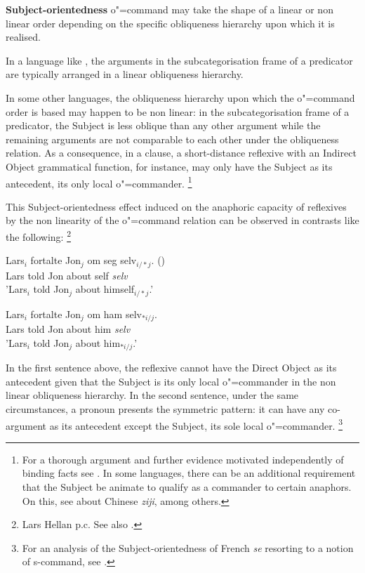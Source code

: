 \documentclass[output=paper
,modfonts
,nonflat]{langsci/langscibook}
\begin{document}
\textbf{Subject-orientedness} o"=command may take the shape of a linear or non linear order
depending on the specific obliqueness hierarchy upon which it is 
realised.

In a language like , the arguments in the
subcategorisation frame of a predicator are typically arranged in a linear obliqueness
hierarchy.

In some other languages, the obliqueness hierarchy upon which the o"=command order
is based may happen to be non linear: in the subcategorisation frame of a
predicator, the Subject is less oblique than any other argument while the remaining arguments
are not comparable to each other under the obliqueness relation. As a consequence, in a clause,
a short-distance reflexive with an Indirect Object grammatical function, for instance, may only
have the Subject as its antecedent, its only local o"=commander.%
\footnote{For a thorough argument and further evidence motivated
independently of binding facts see \citep{branco:branch96, brancoMarrafa:subject97, branco:livro00}. In 
some languages, there can be an additional requirement that the Subject be
animate to qualify as a commander to certain anaphors. On this, 
see \citep{huangTang:longdistance91, xue:ziji94} about Chinese {\em ziji}, among others.}
%

This Subject-orientedness effect induced on the anaphoric capacity of reflexives
by the non linearity of the o"=command relation can be observed in contrasts like
the following:%
\footnote{
Lars Hellan p.c. See also \citep[]{hellan:book88}.}

\begin{exe}
\ex
\begin{xlist}
\ex
\gll Lars$_{i}$ fortalte Jon$_{j}$ om seg selv$_{i/*j}$. ()
\\ 
Lars told Jon about self {\em selv} \\
\trans 'Lars$_{i}$ told Jon$_{j}$ about himself$_{i/*j}$.'

\ex
\gll Lars$_{i}$ fortalte Jon$_{j}$ om ham selv$_{*i/j}$.\\
Lars told Jon about him {\em selv}\\
\trans 'Lars$_{i}$ told Jon$_{j}$ about him$_{*i/j}$.'
\end{xlist}
\end{exe}


In the first sentence above, the reflexive cannot have the
Direct Object as its antecedent given that the Subject is its only
local  o"=commander in the non linear obliqueness hierarchy.
In the second sentence, under the same circumstances, a pronoun
presents the symmetric pattern: it can have any co-argument as
its antecedent except the Subject, its sole local o"=commander.%
%
\footnote{
For an analysis of the Subject-orientedness of French {\em se} resorting
to a notion of s-command, see \citep{abeille:depend98, abeille:composition98}.
}
\end{document}
